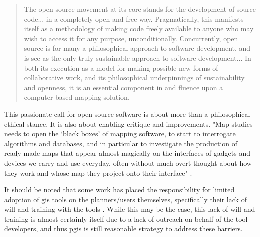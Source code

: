 \documentclass[notitlepage]{article}
\begin{document}
\blockquote{The open source movement at its core stands for the development of source code... in a completely open and free way. Pragmatically, this manifests itself as a methodology of making code freely available to anyone who may wish to access it for any purpose, unconditionally. Concurrently, open source is for many a philosophical approach to software development, and is see as the only truly sustainable approach to software development... In both its execution as a model for making possible new forms of collaborative work, and its philosophical underpinnings of sustainability and openness, it is an essential component in and fluence upon a computer-based mapping solution.}

This passionate call for open source software is about more than a philosophical ethical stance. It is also about enabling critique and improvements. "Map studies needs to open the `black boxes' of mapping software, to start to interrogate algorithms and databases, and in particular to investigate the production of ready-made maps that appear almost magically on the interfaces of gadgets and devices we carry and use everyday, often without much overt thought about how they work and whose map they project onto their interface" \cite{dodgeMappingModesMethods2011}.

It should be noted that some work has placed the responsibility for limited adoption of \ac{gis} tools on the planners/users themselves, specifically their lack of will and training with the tools \cite{gocmenBarriersGISUse2010}. While this may be the case, this lack of will and training is almost certainly itself due to a lack of outreach on behalf of the tool developers, and thus \ac{pgis} is still reasonable strategy to address these barriers.	 


%
%
\end{document}

